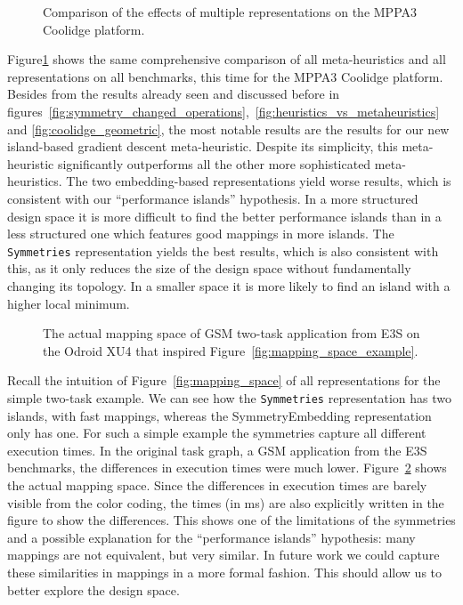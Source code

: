 \begin{figure}[h]
	\centering
   \resizebox{0.95\textwidth}{!}{}
	\caption{Comparison of the effects of multiple representations on the MPPA3 Coolidge platform.}
	\label{fig:multiple_representations_coolidge}
\end{figure}

Figure\ref{fig:multiple_representations_coolidge} shows the same comprehensive comparison of all meta-heuristics and all representations on all benchmarks, this time for the MPPA3 Coolidge platform. 
Besides from the results already seen and discussed before in figures~\ref{fig:symmetry_changed_operations},~\ref{fig:heuristics_vs_metaheuristics} and \ref{fig:coolidge_geometric}, the most notable results are the results for our new island-based gradient descent meta-heuristic.
Despite its simplicity, this meta-heuristic significantly outperforms all the other more sophisticated meta-heuristics.
The two embedding-based representations yield worse results, which is consistent with our ``performance islands'' hypothesis.
In a more structured design space it is more difficult to find the better performance islands than in a less structured one which features good mappings in more islands.
The \texttt{Symmetries} representation yields the best results, which is also consistent with this, as it only reduces the size of the design space without fundamentally changing its topology.
In a smaller space it is more likely to find an island with a higher local minimum.

\begin{figure}[h]
	\centering
	\caption{The actual mapping space of  GSM two-task application from \ac{E3S} on the Odroid XU4 that inspired Figure~\ref{fig:mapping_space_example}.}
	\label{fig:gsm_actual_mapping_space}
\end{figure}


Recall the intuition of Figure~\ref{fig:mapping_space} of all representations for the simple two-task example.
We can see how the \texttt{Symmetries} representation has two islands, with fast mappings, whereas the \ac{SymmetryEmbedding} representation only has one.
For such a simple example the symmetries capture all different execution times.
In the original task graph, a \ac{GSM} application from the \ac{E3S} benchmarks, the differences in execution times were much lower. 
Figure~\ref{fig:gsm_actual_mapping_space} shows the actual mapping space. Since the differences in execution times are barely visible from the color coding, the times (in ms) are also explicitly written in the figure to show the differences.
This shows one of the limitations of the symmetries and a possible explanation for the ``performance islands'' hypothesis: many mappings are not equivalent, but very similar.
In future work we could capture these similarities in mappings in a more formal fashion.
This should allow us to better explore the design space.